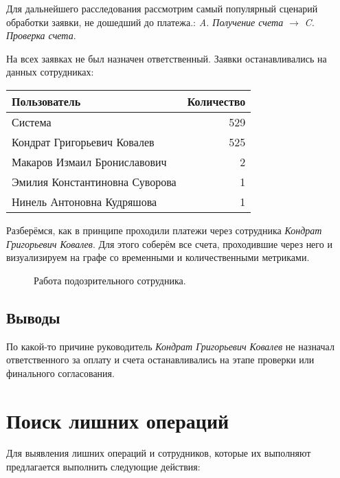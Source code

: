 \documentclass[12pt]{article}
\newcommand{\imgh}[3]
{
\begin{figure}[h]
\center{\texttt{[image: \#2]}}
\caption{#3}
\label{ris:#2}
\end{figure}
}
\begin{document}
Для дальнейшего расследования рассмотрим самый популярный сценарий обработки заявки, не дошедший до платежа.: \textit{A. Получение счета} $\rightarrow$ \textit{C. Проверка счета}.

На всех заявках не был назначен ответственный. 
Заявки останавливались на данных сотрудниках:

\begin{small}
\begin{tabular}{lr}
    \hline
    Пользователь                   &    Количество \\
    \hline
    Система                        &           529 \\
    Кондрат Григорьевич Ковалев    &           525 \\
    Макаров Измаил Брониславович   &             2 \\
    Эмилия Константиновна Суворова &             1 \\
    Нинель Антоновна Кудряшова     &             1 \\
    \hline
\end{tabular} 
\end{small}
\newpage

Разберёмся, как в принципе проходили платежи через сотрудника \textit{Кондрат Григорьевич Ковалев}. Для этого соберём все счета, проходившие через него и визуализируем на графе со временными и количественными метриками. 

\imgh{13cm}{suspicious_metric_graph.png}{Работа подозрительного сотрудника.}

\subsection*{Выводы}
По какой-то причине руководитель \textit{Кондрат Григорьевич Ковалев} не назначал ответственного за оплату и счета останавливались на этапе проверки или финального согласования. 
\newpage


\section{Поиск лишних операций}
Для выявления лишних операций и сотрудников, которые их выполняют предлагается выполнить следующие действия:
\end{document}
